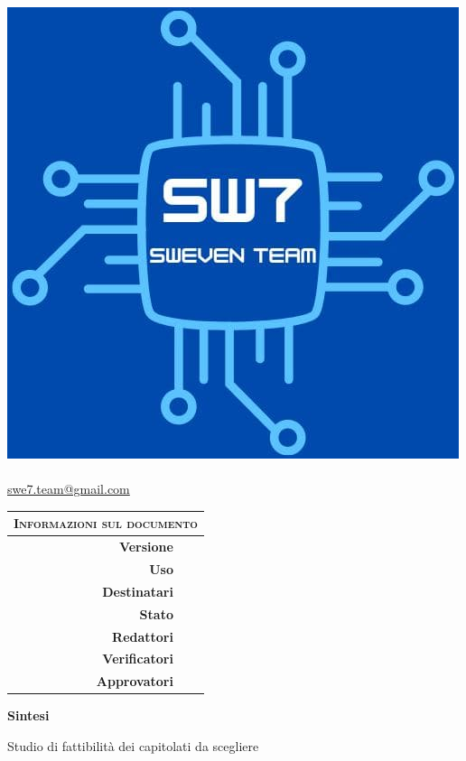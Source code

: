 \documentclass[12pt, a4paper,table]{article}
\title{\textsc{\docNome}}
\author{}
\date{}
\begin{document}
	\maketitle
	\vspace{-3em}
	\begin{center}
	\includegraphics[scale=0.50]{images/logo.jpg} \\
	\vspace{2em}
	\huge \textsc{\docNomeTeam}\\
	\normalsize \href{mailto:swe7.team@gmail.com}{swe7.team@gmail.com}\\
	\vspace{2em}
	\begin{tabular}{r|l}
		\multicolumn{2}{c}{ \textsc{Informazioni sul documento} } \\
		\hline
		\textbf{Versione}     & \docVersione\\
		\textbf{Uso}          & \docUso\\
        	\textbf{Destinatari}  & \docDestinatari\\ %
		\textbf{Stato}        & \docStatus\\
		\textbf{Redattori}    & \docRedattori\\
		\textbf{Verificatori} & \docVerificatori\\
		\textbf{Approvatori} & \docApprovazione\\
	\end{tabular}
	\end{center}
    \vspace{3em}
    \begin{center}
        \LARGE{\textbf{Sintesi}} 
    \end{center}
    \normalsize{Studio di fattibilità dei capitolati da scegliere}
	\thispagestyle{empty}   
	\newpage
	
\end{document}
